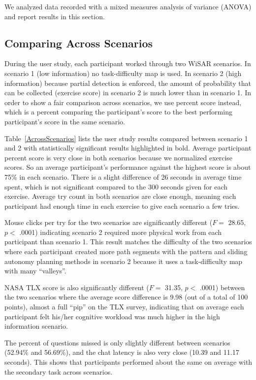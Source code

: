 \documentclass[lettersize, apacite, twoside, HRI]{apa_HRI}
\begin{document}
We analyzed data recorded with a mixed measures analysis of variance (ANOVA) and report results in this section.

\subsection{Comparing Across Scenarios}

During the user study, each participant worked through two WiSAR scenarios. In scenario 1 (low information) no task-difficulty map is used. In scenario 2 (high information) because partial detection is enforced, the amount of probability that can be collected (exercise score) in scenario 2 is much lower than in scenario 1. In order to show a fair comparison across scenarios, we use percent score instead, which is a percent comparing the participant's score to the best performing participant's score in the same scenario.

Table~\ref{AcrossScenarios} lists the user study results compared between scenario 1 and 2 with statistically significant results highlighted in bold. Average participant percent score is very close in both scenarios because we normalized exercise scores. So an average participant's performance against the highest score is about 75\% in each scenario. There is a slight difference of 26 seconds in average time spent, which is not significant compared to the 300 seconds given for each exercise. Average try count in both scenarios are close enough, meaning each participant had enough time in each exercise to give each scenario a few tries.

Mouse clicks per try for the two scenarios are significantly different ($F=$ 28.65, $p<$ .0001) indicating scenario 2 required more physical work from each participant than scenario 1. This result matches the difficulty of the two scenarios where each participant created more path segments with the pattern and sliding autonomy planning methods in scenario 2 because it uses a task-difficulty map with many ``valleys''.

NASA TLX score is also significantly different ($F=$ 31.35, $p<$ .0001) between the two scenarios where the average score difference is 9.98 (out of a total of 100 points), almost a full ``pip'' on the TLX survey, indicating that on average each participant felt his/her cognitive workload was much higher in the high information scenario.

The percent of questions missed is only slightly different between scenarios (52.94\% and 56.69\%), and the chat latency is also very close (10.39 and 11.17 seconds). This shows that participants performed about the same on average with the secondary task across scenarios.
\end{document}
